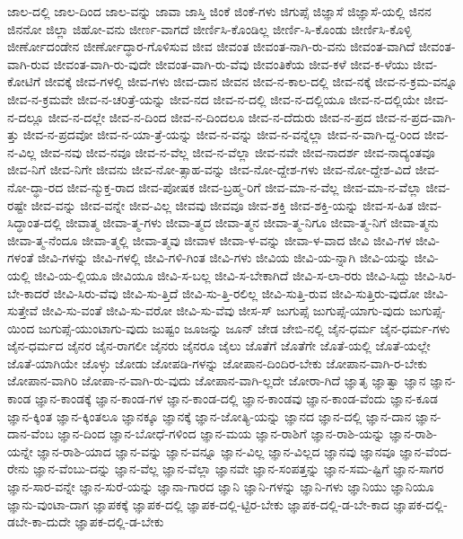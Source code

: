 {ಜಾಲ-ದಲ್ಲಿ
ಜಾಲ-ದಿಂದ
ಜಾಲ-ವನ್ನು
ಜಾವಾ
ಜಾಸ್ತಿ
ಜಿಂಕೆ
ಜಿಂಕೆ-ಗಳು
ಜಿಗುಪ್ಸೆ
ಜಿಜ್ಞಾಸೆ
ಜಿಜ್ಞಾಸೆ-ಯಲ್ಲಿ
ಜಿನನ
ಜಿನನೋ
ಜಿಲ್ಲಾ
ಜಿಹೋ-ವನು
ಜೀರ್ಣ-ವಾಗದೆ
ಜೀರ್ಣಿಸಿ-ಕೊಂಡಿಲ್ಲ
ಜೀರ್ಣಿ-ಸಿ-ಕೊಂಡು
ಜೀರ್ಣಿಸಿ-ಕೊಳ್ಳಿ
ಜೀರ್ಣೋದಂಡೇನ
ಜೀರ್ಣೋದ್ಧಾರ-ಗೊಳಿಸುವ
ಜೀವ
ಜೀವಂತ
ಜೀವಂತ-ನಾಗಿ-ರು-ವನು
ಜೀವಂತ-ವಾಗಿದೆ
ಜೀವಂತ-ವಾಗಿ-ರುವ
ಜೀವಂತ-ವಾಗಿ-ರು-ವುದೇ
ಜೀವಂತ-ವಾಗಿ-ರು-ವೆವು
ಜೀವಂತಿಕೆಯ
ಜೀವ-ಕಳೆ
ಜೀವ-ಕ-ಳೆಯು
ಜೀವ-ಕೋಟಿಗೆ
ಜೀವಕ್ಕೆ
ಜೀವ-ಗಳಲ್ಲಿ
ಜೀವ-ಗಳು
ಜೀವ-ದಾನ
ಜೀವನ
ಜೀವ-ನ-ಕಾಲ-ದಲ್ಲಿ
ಜೀವ-ನಕ್ಕೆ
ಜೀವ-ನ-ಕ್ರಮ-ವನ್ನೂ
ಜೀವ-ನ-ಕ್ರಮವೇ
ಜೀವ-ನ-ಚರಿತ್ರೆ-ಯನ್ನು
ಜೀವ-ನದ
ಜೀವ-ನ-ದಲ್ಲಿ
ಜೀವ-ನ-ದಲ್ಲಿಯೂ
ಜೀವ-ನ-ದಲ್ಲಿಯೇ
ಜೀವ-ನ-ದಲ್ಲೂ
ಜೀವ-ನ-ದಲ್ಲೇ
ಜೀವ-ನ-ದಿಂದ
ಜೀವ-ನ-ದಿಂದಲೂ
ಜೀವ-ನ-ದೆದುರು
ಜೀವ-ನ-ಪ್ರದ
ಜೀವ-ನ-ಪ್ರದ-ವಾಗಿ-ತ್ತು
ಜೀವ-ನ-ಪ್ರದವೋ
ಜೀವ-ನ-ಯಾ-ತ್ರೆ-ಯನ್ನು
ಜೀವ-ನ-ವನ್ನು
ಜೀವ-ನ-ವನ್ನೆಲ್ಲಾ
ಜೀವ-ನ-ವಾಗಿ-ದ್ದ-ರಿಂದ
ಜೀವ-ನ-ವಿಲ್ಲ
ಜೀವ-ನವು
ಜೀವ-ನವೂ
ಜೀವ-ನ-ವೆಲ್ಲ
ಜೀವ-ನ-ವೆಲ್ಲಾ
ಜೀವ-ನವೇ
ಜೀವ-ನಾದರ್ಶ
ಜೀವ-ನಾದ್ಯಂತವೂ
ಜೀವ-ನಿಗೆ
ಜೀವ-ನಿಗೇ
ಜೀವನು
ಜೀವ-ನೋ-ತ್ಸಾಹ-ವನ್ನು
ಜೀವ-ನೋ-ದ್ದೇಶ-ಗಳು
ಜೀವ-ನೋ-ದ್ದೇಶ-ವಿದೆ
ಜೀವ-ನೋ-ದ್ಧಾ-ರದ
ಜೀವ-ನ್ಮುಕ್ತ-ರಾದ
ಜೀವ-ಪೋಷಕ
ಜೀವ-ಬ್ರಹ್ಮ-ರಿಗೆ
ಜೀವ-ಮಾ-ನ-ವೆಲ್ಲ
ಜೀವ-ಮಾ-ನ-ವೆಲ್ಲಾ
ಜೀವ-ರಷ್ಟೇ
ಜೀವ-ವನ್ನು
ಜೀವ-ವನ್ನೇ
ಜೀವ-ವಿಲ್ಲ
ಜೀವವು
ಜೀವವೂ
ಜೀವ-ಶಕ್ತಿ
ಜೀವ-ಶಕ್ತಿ-ಯನ್ನು
ಜೀವ-ಸ-ಹಿತ
ಜೀವ-ಸಿದ್ಧಾಂತ-ದಲ್ಲಿ
ಜೀವಾತ್ಮ
ಜೀವಾ-ತ್ಮ-ಗಳು
ಜೀವಾ-ತ್ಮದ
ಜೀವಾ-ತ್ಮನ
ಜೀವಾ-ತ್ಮ-ನಿಗೂ
ಜೀವಾ-ತ್ಮ-ನಿಗೆ
ಜೀವಾ-ತ್ಮನು
ಜೀವಾ-ತ್ಮ-ನೆಂದೂ
ಜೀವಾ-ತ್ಮಲ್ಲಿ
ಜೀವಾ-ತ್ಮವು
ಜೀವಾಳ
ಜೀವಾ-ಳ-ವನ್ನು
ಜೀವಾ-ಳ-ವಾದ
ಜೀವಿ
ಜೀವಿ-ಗಳ
ಜೀವಿ-ಗಳಂತೆ
ಜೀವಿ-ಗಳನ್ನು
ಜೀವಿ-ಗಳಲ್ಲಿ
ಜೀವಿ-ಗಳಿ-ಗಿಂತ
ಜೀವಿ-ಗಳು
ಜೀವಿಯ
ಜೀವಿ-ಯ-ನ್ನಾಗಿ
ಜೀವಿ-ಯನ್ನು
ಜೀವಿ-ಯಲ್ಲಿ
ಜೀವಿ-ಯ-ಲ್ಲಿಯೂ
ಜೀವಿಯೂ
ಜೀವಿ-ಸ-ಬಲ್ಲ
ಜೀವಿ-ಸ-ಬೇಕಾಗಿದೆ
ಜೀವಿ-ಸ-ಲಾ-ರರು
ಜೀವಿ-ಸಿದ್ದು
ಜೀವಿ-ಸಿರ-ಬೇ-ಕಾದರೆ
ಜೀವಿ-ಸಿರು-ವೆವು
ಜೀವಿ-ಸು-ತ್ತಿದೆ
ಜೀವಿ-ಸು-ತ್ತಿ-ರಲಿಲ್ಲ
ಜೀವಿ-ಸುತ್ತಿ-ರುವ
ಜೀವಿ-ಸುತ್ತಿರು-ವುದೋ
ಜೀವಿ-ಸುತ್ತೇವೆ
ಜೀವಿ-ಸು-ವಂತೆ
ಜೀವಿ-ಸು-ವರೋ
ಜೀವಿ-ಸು-ವೆವು
ಜೀಸ-ಸ್
ಜುಗುಪ್ಸೆ
ಜುಗುಪ್ಸೆ-ಯಾಗು-ವುದು
ಜುಗುಪ್ಸೆ-ಯಿಂದ
ಜುಗುಪ್ಸೆ-ಯುಂಟಾಗು-ವುದು
ಜುಷ್ಟಂ
ಜೂಜನ್ನು
ಜೂನ್
ಜೇಡ
ಜೇಬಿ-ನಲ್ಲಿ
ಜೈನ-ಧರ್ಮ
ಜೈನ-ಧರ್ಮ-ಗಳು
ಜೈನ-ಧರ್ಮದ
ಜೈನರ
ಜೈನ-ರಾಗಲೀ
ಜೈನರು
ಜೈನರೂ
ಜೈಲು
ಜೊತೆಗೆ
ಜೊತೆಗೇ
ಜೊತೆ-ಯಲ್ಲಿ
ಜೊತೆ-ಯಲ್ಲೇ
ಜೊತೆ-ಯಾಗಿಯೇ
ಜೊಳ್ಳು
ಜೋಡು
ಜೋಪಡಿ-ಗಳನ್ನು
ಜೋಪಾನ-ದಿಂದಿರ-ಬೇಕು
ಜೋಪಾನ-ವಾಗಿ-ರ-ಬೇಕು
ಜೋಪಾನ-ವಾಗಿರಿ
ಜೋಪಾ-ನ-ವಾಗಿ-ರು-ವುದು
ಜೋಪಾನ-ವಾಗಿ-ಲ್ಲದೇ
ಜೋರಾ-ಗಿದೆ
ಜ್ಞಾತೃ
ಜ್ಞಾತ್ವಾ
ಜ್ಞಾನ
ಜ್ಞಾನ-ಕಾಂಡ
ಜ್ಞಾನ-ಕಾಂಡಕ್ಕೆ
ಜ್ಞಾನ-ಕಾಂಡ-ಗಳ
ಜ್ಞಾನ-ಕಾಂಡ-ದಲ್ಲಿ
ಜ್ಞಾನ-ಕಾಂಡವು
ಜ್ಞಾನ-ಕಾಂಡ-ವೆಂದು
ಜ್ಞಾನ-ಕೂಡ
ಜ್ಞಾನ-ಕ್ಕಿಂತ
ಜ್ಞಾನ-ಕ್ಕಿಂತಲೂ
ಜ್ಞಾನಕ್ಕೂ
ಜ್ಞಾನಕ್ಕೆ
ಜ್ಞಾನ-ಜೋತ್ಯಿ-ಯನ್ನು
ಜ್ಞಾನದ
ಜ್ಞಾನ-ದಲ್ಲಿ
ಜ್ಞಾನ-ದಾನ
ಜ್ಞಾನ-ದಾನ-ವೆಂಬ
ಜ್ಞಾನ-ದಿಂದ
ಜ್ಞಾನ-ಬೋಧೆ-ಗಳಿಂದ
ಜ್ಞಾನ-ಮಯ
ಜ್ಞಾನ-ರಾಶಿಗೆ
ಜ್ಞಾನ-ರಾಶಿ-ಯನ್ನು
ಜ್ಞಾನ-ರಾಶಿ-ಯನ್ನೇ
ಜ್ಞಾನ-ರಾಶಿ-ಯಾದ
ಜ್ಞಾನ-ವನ್ನು
ಜ್ಞಾನ-ವನ್ನೂ
ಜ್ಞಾನ-ವಿಲ್ಲ
ಜ್ಞಾನ-ವಿಲ್ಲದ
ಜ್ಞಾನವು
ಜ್ಞಾನವೂ
ಜ್ಞಾನ-ವೆಂದ-ರೇನು
ಜ್ಞಾನ-ವೆಂಬು-ದನ್ನು
ಜ್ಞಾನ-ವೆಲ್ಲ
ಜ್ಞಾನ-ವೆಲ್ಲಾ
ಜ್ಞಾನವೇ
ಜ್ಞಾನ-ಸಂಪತ್ತನ್ನು
ಜ್ಞಾನ-ಸಮ-ಷ್ಟಿಗೆ
ಜ್ಞಾನ-ಸಾಗರ
ಜ್ಞಾನ-ಸಾರ-ವನ್ನೇ
ಜ್ಞಾನ-ಸುರೆ-ಯನ್ನು
ಜ್ಞಾನಾ-ಗಾರದ
ಜ್ಞಾನಿ
ಜ್ಞಾನಿ-ಗಳನ್ನು
ಜ್ಞಾನಿ-ಗಳು
ಜ್ಞಾನಿಯು
ಜ್ಞಾನಿಯೂ
ಜ್ಞಾನು-ವುಂಟಾ-ದಾಗ
ಜ್ಞಾಪಕಕ್ಕೆ
ಜ್ಞಾಪಕ-ದಲ್ಲಿ
ಜ್ಞಾಪಕ-ದಲ್ಲಿ-ಟ್ಟಿರ-ಬೇಕು
ಜ್ಞಾಪಕ-ದಲ್ಲಿ-ಡ-ಬೇ-ಕಾದ
ಜ್ಞಾಪಕ-ದಲ್ಲಿ-ಡಬೇ-ಕಾ-ದುದೇ
ಜ್ಞಾಪಕ-ದಲ್ಲಿ-ಡ-ಬೇಕು
}
